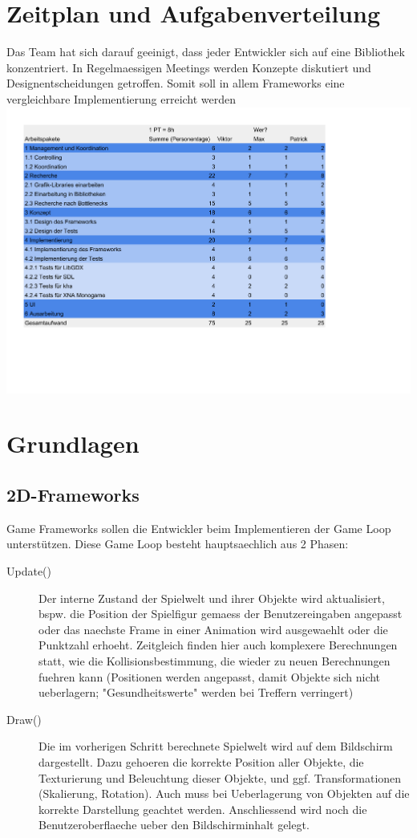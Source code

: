 \chapter{Zeitplan und Aufgabenverteilung}
Das Team hat sich darauf geeinigt, dass jeder Entwickler sich auf eine Bibliothek konzentriert. In Regelmaessigen Meetings werden Konzepte diskutiert und Designentscheidungen getroffen. Somit soll in allem Frameworks eine vergleichbare Implementierung erreicht werden
\includegraphics[width=1.2\textwidth]{projektplan.pdf}


\chapter{Grundlagen}
\section{2D-Frameworks}
Game Frameworks sollen die Entwickler beim Implementieren der Game Loop unterstützen. Diese Game Loop besteht hauptsaechlich aus 2 Phasen:

\begin{description}

\item[Update()] Der interne Zustand der Spielwelt und ihrer Objekte wird aktualisiert, bspw. die Position der Spielfigur gemaess der Benutzereingaben angepasst oder das naechste Frame in einer Animation wird ausgewaehlt oder die Punktzahl erhoeht. Zeitgleich finden hier auch komplexere Berechnungen statt, wie die Kollisionsbestimmung, die wieder zu neuen Berechnungen fuehren kann (Positionen werden angepasst, damit Objekte sich nicht ueberlagern; "Gesundheitswerte" werden bei Treffern verringert)
\item[Draw()] Die im vorherigen Schritt berechnete Spielwelt wird auf dem Bildschirm dargestellt. Dazu gehoeren die korrekte Position aller Objekte, die Texturierung und Beleuchtung dieser Objekte, und ggf. Transformationen (Skalierung, Rotation). Auch muss bei Ueberlagerung von Objekten auf die korrekte Darstellung geachtet werden. Anschliessend wird noch die Benutzeroberflaeche ueber den Bildschirminhalt gelegt.
\end{description}

